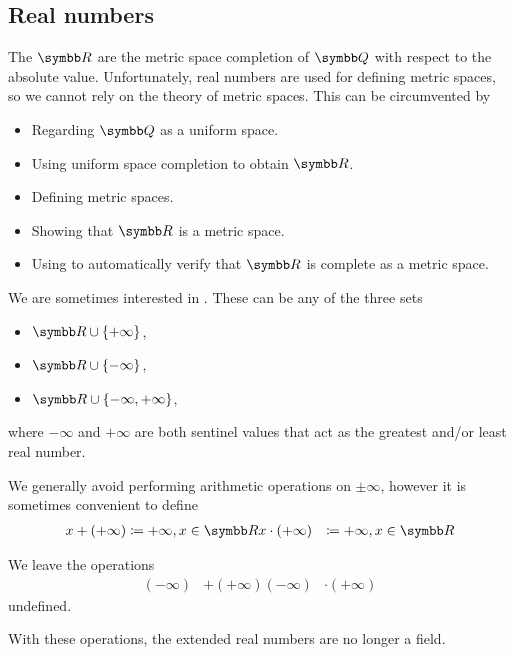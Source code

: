 \subsection{Real numbers}\label{subsec:real_numbers}

\begin{definition}\label{def:real_numbers}
  The  \( \BR \) are the metric space completion of \( \BQ \) with respect to the absolute value. Unfortunately, real numbers are used for defining metric spaces, so we cannot rely on the theory of metric spaces. This can be circumvented by
  \begin{itemize}
    \item Regarding \( \BQ \) as a uniform space.
    \item Using uniform space completion to obtain \( \BR \).
    \item Defining metric spaces.
    \item Showing that \( \BR \) is a metric space.
    \item Using  to automatically verify that \( \BR \) is complete as a metric space.
  \end{itemize}
\end{definition}

\begin{definition}\label{def:extended_real_numbers}
  We are sometimes interested in . These can be any of the three sets
  \begin{itemize}
    \item \( \BR \cup \{ +\infty \} \),
    \item \( \BR \cup \{ -\infty \} \),
    \item \( \BR \cup \{ -\infty, +\infty \} \),
  \end{itemize}
  where \( -\infty \) and \( +\infty \) are both sentinel values that act as the greatest and/or least real number.

  We generally avoid performing arithmetic operations on \( \pm \infty \), however it is sometimes convenient to define
  \begin{align*}
    x + (+\infty) &\coloneqq +\infty, x \in \BR
    x \cdot (+\infty) &\coloneqq +\infty, x \in \BR
  \end{align*}

  We leave the operations
  \begin{align*}
    (-\infty) &+ (+\infty)
    (-\infty) &\cdot (+\infty)
  \end{align*}
  undefined.

  With these operations, the extended real numbers are no longer a field.
\end{definition}

